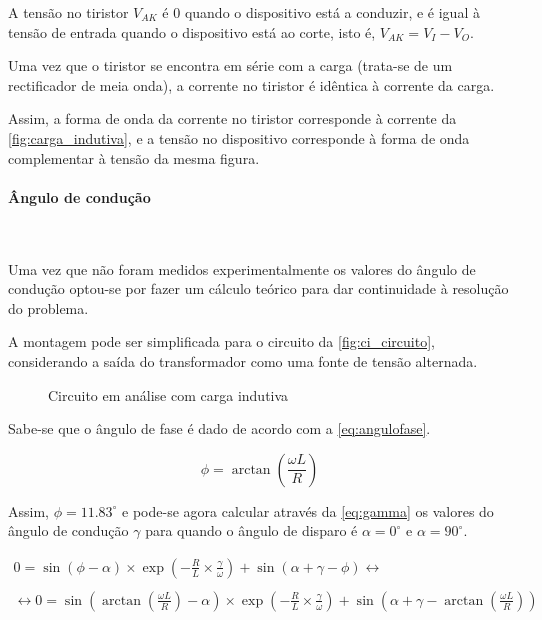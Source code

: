 \documentclass[a4paper,11pt]{article}
\numberwithin{equation}{section}
\begin{document}
A tensão no tiristor $V_{AK}$ é $0$ quando o dispositivo está a conduzir, e é igual à tensão de entrada quando o dispositivo está ao corte, isto é, $V_{AK} = V_I - V_O$.

Uma vez que o tiristor se encontra em série com a carga (trata-se de um rectificador de meia onda), a corrente no tiristor é idêntica à corrente da carga.

Assim, a forma de onda da corrente no tiristor corresponde à corrente da \autoref{fig:carga_indutiva}, e a tensão no dispositivo corresponde à forma de onda complementar à tensão da mesma figura.

\paragraph{Ângulo de condução}\mbox{}\

Uma vez que não foram medidos experimentalmente os valores do ângulo de condução optou-se por fazer um cálculo teórico para dar continuidade à resolução do problema.

A montagem pode ser simplificada para o circuito da \autoref{fig:ci_circuito}, considerando a saída do transformador como uma fonte de tensão alternada.

\begin{figure}[H]
	\centering
	\caption{Circuito em análise com carga indutiva}
	\label{fig:ci_circuito}
\end{figure}

Sabe-se que o ângulo de fase é dado de acordo com a \autoref{eq:angulofase}.

\begin{equation}
\label{eq:angulofase}
\phi =  \arctan \left(\frac{\omega L}{R}\right)
\end{equation}

Assim, $\phi = 11.83^{\circ}$ e pode-se agora calcular através da \autoref{eq:gamma} os valores do ângulo de condução $\gamma$ para quando o ângulo de disparo é $\alpha = 0^{\circ}$ e $\alpha = 90^{\circ}$.

\begin{equation}
\begin{gathered}
0 = \sin \left( \phi - \alpha \right) \times \exp \left( - \frac{R}{L} \times \frac{\gamma}{\omega}\right) + \sin \left( \alpha + \gamma - \phi \right) \leftrightarrow \\ \\
\leftrightarrow 0 = \sin \left( \arctan \left(\frac{\omega L}{R} \right) - \alpha \right) \times \exp \left( - \frac{R}{L} \times \frac{\gamma}{\omega}\right) + \sin \left( \alpha + \gamma - \arctan \left(\frac{\omega L}{R}\right) \right)
\label{eq:gamma}
\end{gathered}
\end{equation}
\end{document}
